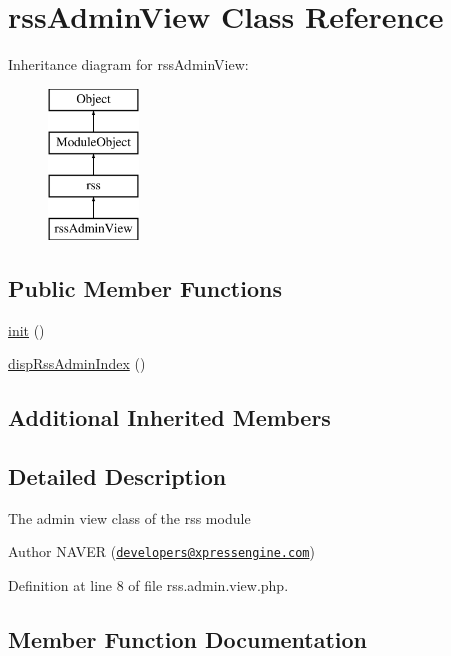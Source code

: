 \hypertarget{classrssAdminView}{}\section{rss\+Admin\+View Class Reference}
\label{classrssAdminView}
Inheritance diagram for rss\+Admin\+View\+:\begin{figure}[H]
\begin{center}
\leavevmode
\includegraphics[height=4.000000cm]{classrssAdminView}
\end{center}
\end{figure}
\subsection*{Public Member Functions}
\begin{DoxyCompactItemize}
\item 
\hyperlink{classrssAdminView_a36015edb6e131ff304bff9140cded3aa}{init} ()
\item 
\hyperlink{classrssAdminView_aaeb7ef076b1882f37d060fa2844035e9}{disp\+Rss\+Admin\+Index} ()
\end{DoxyCompactItemize}
\subsection*{Additional Inherited Members}


\subsection{Detailed Description}
The admin view class of the rss module

\begin{DoxyAuthor}{Author}
N\+A\+V\+ER (\href{mailto:developers@xpressengine.com}{\tt developers@xpressengine.\+com}) 
\end{DoxyAuthor}


Definition at line 8 of file rss.\+admin.\+view.\+php.



\subsection{Member Function Documentation}
\hypertarget{classrssAdminView_aaeb7ef076b1882f37d060fa2844035e9}{}\label{classrssAdminView_aaeb7ef076b1882f37d060fa2844035e9} 
